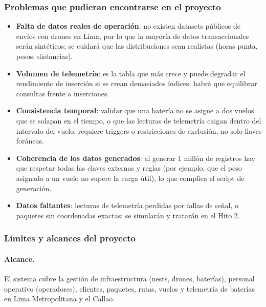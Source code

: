 \documentclass[11pt,a4paper]{article}
\begin{document}
\subsubsection{Problemas que pudieran encontrarse en el proyecto}
\begin{itemize}
\item \textbf{Falta de datos reales de operación}: no existen datasets públicos de envíos con drones en Lima, por lo que la mayoría de datos transaccionales serán sintéticos; se cuidará que las distribuciones sean realistas (horas punta, pesos, distancias).
\item \textbf{Volumen de telemetría}: es la tabla que más crece y puede degradar el rendimiento de inserción si se crean demasiados índices; habrá que equilibrar consultas frente a inserciones.
\item \textbf{Consistencia temporal}: validar que una batería no se asigne a dos vuelos que se solapan en el tiempo, o que las lecturas de telemetría caigan dentro del intervalo del vuelo, requiere triggers o restricciones de exclusión, no solo llaves foráneas.
\item \textbf{Coherencia de los datos generados}: al generar 1 millón de registros hay que respetar todas las claves externas y reglas (por ejemplo, que el peso asignado a un vuelo no supere la carga útil), lo que complica el script de generación.
\item \textbf{Datos faltantes}: lecturas de telemetría perdidas por fallas de señal, o paquetes sin coordenadas exactas; se simularán y tratarán en el Hito 2.
\end{itemize}

\subsubsection{Límites y alcances del proyecto}
\paragraph{Alcance.} El sistema cubre la gestión de infraestructura (nests, drones, baterías), personal operativo (operadores), clientes, paquetes, rutas, vuelos y telemetría de baterías en Lima Metropolitana y el Callao.
\end{document}
